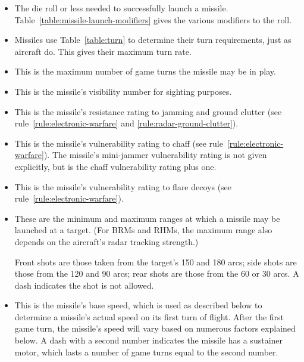 {\begin{itemize}
    \item {} The die roll or less needed to successfully launch a missile. Table~\ref{table:missile-launch-modifiers} gives the various modifiers to the roll.

    \item {} Missiles use Table~\ref{table:turn} to determine their turn requirements, just as aircraft do. This gives their maximum turn rate.

    \item {} This is the maximum number of game turns the missile may be in play.

    \item {} This is the missile's visibility number for sighting purposes.

    \item {} This is the missile's resistance rating to jamming and ground clutter (see rule~\ref{rule:electronic-warfare} and \ref{rule:radar-ground-clutter}).

    \item {} This is the missile's vulnerability rating to chaff (see rule~\ref{rule:electronic-warfare}). The missile’s mini-jammer vulnerability rating is not given explicitly, but is the chaff vulnerability rating plus one.

    \item {} This is the missile's vulnerability rating to flare decoys (see rule~\ref{rule:electronic-warfare}).

    \item {} These are the minimum and maximum ranges at which a missile may be launched at a target. (For BRMs and RHMs, the maximum range also depends on the aircraft's radar tracking strength.)

    Front shots are those taken from the target's 150{\deg} and 180{\deg} arcs; side shots are those from the 120{\deg} and 90{\deg} arcs; rear shots are those from the 60{\deg} or 30{\deg} arcs. A dash indicates the shot is not allowed.

    \item {} This is the missile's base speed, which is used as described below to determine a missile's actual speed on its first turn of flight. After the first game turn, the missile's speed will vary based on numerous factors explained below. A dash with a second number indicates the missile has a sustainer motor, which lasts a number of game turns equal to the second number.


\end{itemize}}
